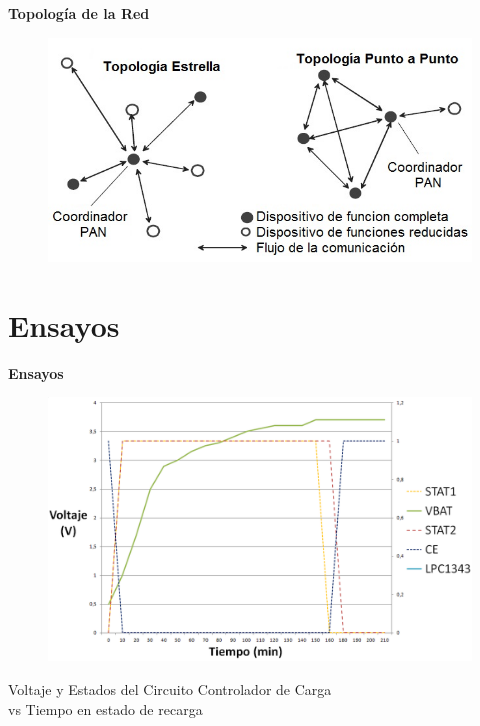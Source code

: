 \documentclass[aspectratio=43, handout]{beamer}
\begin{document}
\begin{frame}{\textbf{\LARGE{Topología de la Red}}}
		\begin{figure}[H]
			{\includegraphics[width=.9\textwidth]{./imagenes/topologia.jpg}}
		\end{figure}	  	  	
\end{frame}

\section{Ensayos}
\begin{frame}{\textbf{\LARGE{Ensayos}}}
\begin{center}
		\begin{figure}[H]
			{\includegraphics[width=1\textwidth]{./imagenes/cargas.png}}
		\end{figure}	
		\vspace{5px} 
		Voltaje y Estados del Circuito Controlador de Carga\\
		vs Tiempo en estado de recarga
\end{center}	  	
\end{frame}
\end{document}
